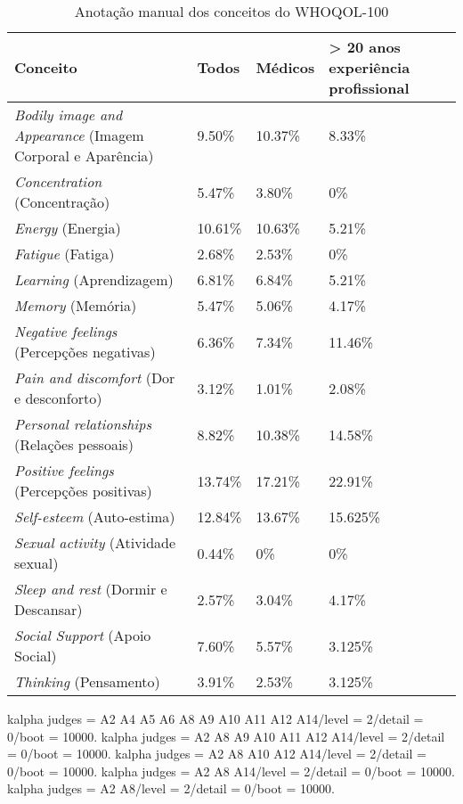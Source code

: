 \begin{table}[H]
\centering
\renewcommand{\arraystretch}{1.3}
\begin{tabular}{|m{5.5cm}|m{2.0cm}|m{2.0cm}|m{2.5cm}|}
\hline
\textbf{Conceito}&\textbf{Todos}&\textbf{Médicos}&\textbf{> 20 anos experiência profissional}\\ \hline

\textit{Bodily image and Appearance} (Imagem Corporal e Aparência) & 9.50\% & 10.37\% & 8.33\% \\ \hline
\textit{Concentration} (Concentração) & 5.47\% & 3.80\% & 0\%\\ \hline
\textit{Energy} (Energia) & 10.61\% & 10.63\% & 5.21\%\\ \hline
\textit{Fatigue} (Fatiga) & 2.68\% & 2.53\% & 0\%\\ \hline
\textit{Learning} (Aprendizagem) & 6.81\% & 6.84\% & 5.21\% \\ \hline
\textit{Memory} (Memória) & 5.47\% & 5.06\% & 4.17\% \\ \hline
\textit{Negative feelings} (Percepções negativas) & 6.36\% & 7.34\% & 11.46\% \\ \hline
\textit{Pain and discomfort} (Dor e desconforto) & 3.12\% & 1.01\% & 2.08\%  \\ \hline
\textit{Personal relationships} (Relações pessoais)& 8.82\% & 10.38\% & 14.58\% \\ \hline
\textit{Positive feelings} (Percepções positivas)& 13.74\% & 17.21\% & 22.91\% \\ \hline
\textit{Self-esteem} (Auto-estima) & 12.84\% & 13.67\%& 15.625\% \\ \hline
\textit{Sexual activity} (Atividade sexual)& 0.44\% & 0\% & 0\%\\ \hline
\textit{Sleep and rest} (Dormir e Descansar)& 2.57\% & 3.04\%& 4.17\% \\ \hline
\textit{Social Support} (Apoio Social) & 7.60\% & 5.57\%& 3.125\% \\ \hline
\textit{Thinking} (Pensamento) & 3.91\% & 2.53\% & 3.125\% \\ \hline

\end{tabular}
\caption{\label{tab:anotacoes-conceitos-wholqol100}Anotação manual dos conceitos do WHOQOL-100}
\end{table}





kalpha judges = A2 A4 A5 A6 A8 A9 A10 A11 A12 A14/level = 2/detail = 0/boot = 10000.
kalpha judges = A2 A8 A9 A10 A11 A12 A14/level = 2/detail = 0/boot = 10000.
kalpha judges = A2 A8 A10 A12 A14/level = 2/detail = 0/boot = 10000.
kalpha judges = A2 A8 A14/level = 2/detail = 0/boot = 10000.
kalpha judges = A2 A8/level = 2/detail = 0/boot = 10000.

